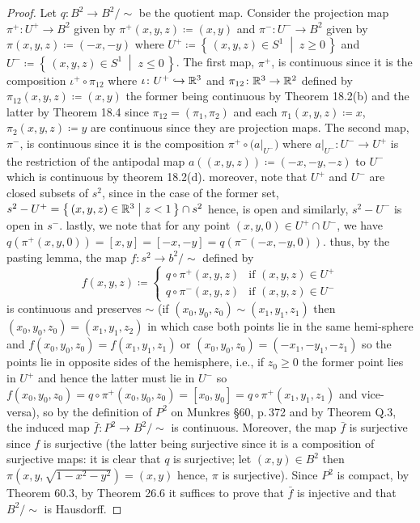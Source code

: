 \begin{proof}
Let $q\colon B^2\to B^2/{\sim}$ be the quotient map. Consider the
projection map $\pi^+\colon U^+\to B^2$ given by
$\pi^+(x,y,z)\coloneqq(x,y)$ and $\pi^-\colon U^-\to B^2$ given by
$\pi(x,y,z)\coloneqq(-x,-y)$ where $U^+\coloneqq\left\{\,(x,y,z)\in
  S^1\;\middle|\;z\geq 0\,\right\}$ and $U^-\coloneqq\left\{\,(x,y,z)\in
  S^1\;\middle|\;z\leq 0\,\right\}$. The first map, $\pi^+$, is continuous
since it is the composition $\iota^+\circ\pi_{12}$ where $\iota\colon
U^+\hookrightarrow\mathbb{R}^3$ and $\pi_{12}\colon\mathbb{R}^3\to\mathbb{R}^2$ defined by
$\pi_{12}(x,y,z)\coloneqq(x,y)$ the former being continuous by Theorem
18.2(b) and the latter by Theorem 18.4 since $\pi_{12}=(\pi_1,\pi_2)$ and
each $\pi_1(x,y,z)\coloneqq x$, $\pi_2(x,y,z)\coloneqq y$ are continuous
since they are projection maps. The second map, $\pi^-$, is continuous
since it is the composition $\pi^+\circ\bigl(\left.a\right|_{U^-}\bigr)$
where $\left.a\right|_{U^-}\colon U^-\to U^+$ is the restriction of the
antipodal map $a((x,y,z))\coloneqq(-x,-y,-z)$ to $U^-$ which is continuous
by theorem 18.2(d). moreover, note that $U^+$ and $U^-$ are closed subsets
of $s^2$, since in the case of the former set,
$s^2-U^+=\left\{\,(x,y,z)\in\mathbb{R}^3\;\middle|\;z<1\,\right\}\cap s^2$ hence,
is open and similarly, $s^2-U^-$ is open in $s^-$. lastly, we note that for
any point $(x,y,0)\in U^+\cap U^-$, we have
$q(\pi^+(x,y,0))=[x,y]=[-x,-y]=q(\pi^-(-x,-y,0))$. thus, by the pasting
lemma, the map $f\colon s^2\to b^2/{\sim}$ defined by
\[
f(x,y,z)\coloneqq
\begin{cases}
q\circ\pi^+(x,y,z)&\text{if $(x,y,z)\in U^+$}\\
q\circ\pi^-(x,y,z)&\text{if $(x,y,z)\in U^-$}
\end{cases}
\]
is continuous and preserves $\sim$ (if $(x_0,y_0,z_0)\sim (x_1,y_1,z_1)$
then $(x_0,y_0,z_0)=(x_1,y_1,z_2)$ in which case both points lie in the
same hemi-sphere and $f(x_0,y_0,z_0)=f(x_1,y_1,z_1)$ or
$(x_0,y_0,z_0)=(-x_1,-y_1,-z_1)$ so the points lie in opposite sides of the
hemisphere, i.e., if $z_0\geq 0$ the former point lies in $U^+$ and hence
the latter must lie in $U^-$  so
$f(x_0,y_0,z_0)=q\circ\pi^+(x_0,y_0,z_0)=[x_0,y_0]=q\circ\pi^+(x_1,y_1,z_1)$
and vice-versa), so by the definition of $P^2$ on Munkres \S60, p.\,372 and
by Theorem Q.3, the induced map $\bar f\colon P^2\to B^2/{\sim}$ is
continuous. Moreover, the map $\bar f$ is surjective since $f$ is
surjective (the latter being surjective since it is a composition of
surjective maps: it is clear that $q$ is surjective; let $(x,y)\in B^2$
then $\pi(x,y,\sqrt{1-x^2-y^2})=(x,y)$ hence, $\pi$ is surjective). Since
$P^2$ is compact, by Theorem 60.3, by Theorem 26.6 it suffices to prove
that $\bar f$ is injective and that $B^2/{\sim}$ is Hausdorff.


\end{proof}
